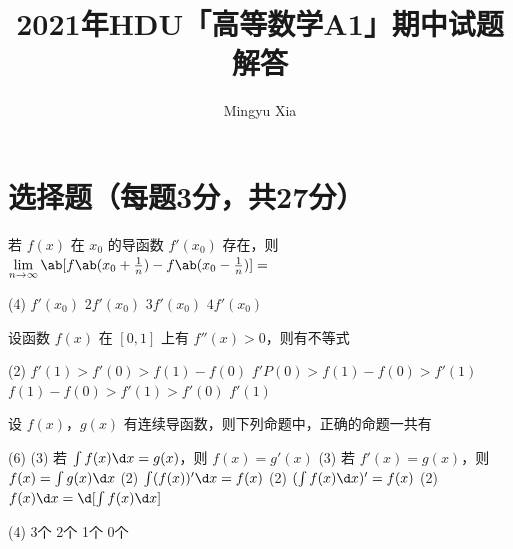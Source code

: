 \documentclass[quiet]{ctexart}
\title{\sffamily\bfseries 2021年HDU「高等数学A1」期中试题解答}
\author{Mingyu Xia}
\begin{document}
\maketitle

\section{选择题（每题3分，共27分）}

\begin{problem}
  若 $f(x)$ 在 $x_0$ 的导函数 $f'(x_0)$ 存在，则
  $\lim\limits_{n \to \infty} \ab[f\ab(x_0 + \frac1n) - f\ab(x_0 - \frac1n)] = $
  \begin{tasks}(4)
    \task $f'(x_0)$
    \task[\true] $2f'(x_0)$
    \task $3f'(x_0)$
    \task $4f'(x_0)$
  \end{tasks}
\end{problem}
\begin{solution}

\end{solution}

\begin{problem}
  设函数 $f(x)$ 在 $[0,1]$ 上有 $f''(x) > 0$，则有不等式
  \begin{tasks}(2)
    \task $f'(1) > f'(0) > f(1) - f(0)$
    \task $f'P(0) > f(1) - f(0) > f'(1)$
    \task $f(1) - f(0) > f'(1) > f'(0)$
    \task[\true] $f'(1)$
  \end{tasks}
\end{problem}
\begin{solution}
  
\end{solution}

\begin{problem}
  设 $f(x)$，$g(x)$ 有连续导函数，则下列命题中，正确的命题一共有
  \begin{tasks}[label = \roman*.](6)
    \task*(3) 若 $\int f(x) \d x = g(x)$，则 $f(x) = g'(x)$
    \task*(3) 若 $f'(x) = g(x)$，则 $f(x) = \int g(x) \d x$
    \task*(2) $\int (f(x))' \d x = f(x)$
    \task*(2) $(\int f(x) \d x)' = f(x)$
    \task*(2) $f(x) \d x = \d[\int f(x) \d x]$
  \end{tasks}
  \begin{tasks}(4)
    \task 3个
    \task[\true] 2个
    \task 1个
    \task 0个
  \end{tasks}
\end{problem}
\begin{solution}
  
\end{solution}
\end{document}
